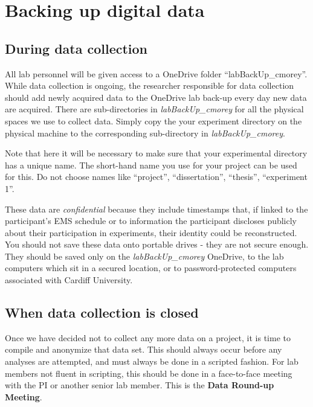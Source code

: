 \documentclass[
  12pt,
]{book}
\begin{document}
\section{Backing up digital data}\label{backing-up-digital-data}

\subsection{During data collection}\label{during-data-collection}

All lab personnel will be given access to a OneDrive folder ``labBackUp\_cmorey''. While data collection is ongoing, the researcher responsible for data collection should add newly acquired data to the OneDrive lab back-up every day new data are acquired. There are sub-directories in \emph{labBackUp\_cmorey} for all the physical spaces we use to collect data. Simply copy the your experiment directory on the physical machine to the corresponding sub-directory in \emph{labBackUp\_cmorey}.

Note that here it will be necessary to make sure that your experimental directory has a unique name. The short-hand name you use for your project can be used for this. Do not choose names like ``project'', ``dissertation'', ``thesis'', ``experiment 1''.

These data are \emph{confidential} because they include timestamps that, if linked to the participant's EMS schedule or to information the participant discloses publicly about their participation in experiments, their identity could be reconstructed. You should not save these data onto portable drives - they are not secure enough. They should be saved only on the \emph{labBackUp\_cmorey} OneDrive, to the lab computers which sit in a secured location, or to password-protected computers associated with Cardiff University.

\subsection{When data collection is closed}\label{when-data-collection-is-closed}

Once we have decided not to collect any more data on a project, it is time to compile and anonymize that data set. This should always occur before any analyses are attempted, and must always be done in a scripted fashion. For lab members not fluent in scripting, this should be done in a face-to-face meeting with the PI or another senior lab member. This is the \textbf{Data Round-up Meeting}.
\end{document}
